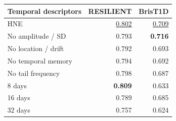 \begin{tabular*}{\linewidth}{@{\extracolsep{\fill}}lrr@{}}
\toprule
Temporal descriptors & RESILIENT & BrisT1D \\
\midrule
\cellcolor{hnegray}HNE & \underline{0.802} & \underline{0.709} \\
No amplitude / SD & 0.793 & \textbf{0.716} \\
No location / drift & 0.792 & 0.693 \\
No temporal memory & 0.794 & 0.692 \\
No tail frequency & 0.798 & 0.687 \\
8 days & \textbf{0.809} & 0.633 \\
16 days & 0.789 & 0.685 \\
32 days & 0.757 & 0.624 \\
\bottomrule
\end{tabular*}